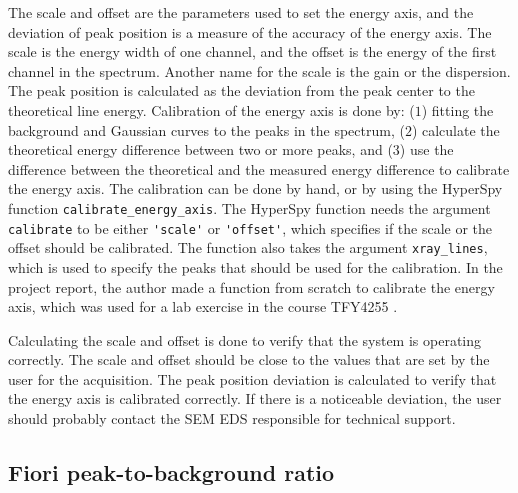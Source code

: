 The scale and offset are the parameters used to set the energy axis, and the deviation of peak position is a measure of the accuracy of the energy axis.
The scale is the energy width of one channel, and the offset is the energy of the first channel in the spectrum.
Another name for the scale is the gain or the dispersion.
The peak position is calculated as the deviation from the peak center to the theoretical line energy.
Calibration of the energy axis is done by: ($1$) fitting the background and Gaussian curves to the peaks in the spectrum, ($2$) calculate the theoretical energy difference between two or more peaks, and ($3$) use the difference between the theoretical and the measured energy difference to calibrate the energy axis.
The calibration can be done by hand, or by using the HyperSpy function \verb|calibrate_energy_axis|.
The HyperSpy function needs the argument \verb|calibrate| to be either \verb|'scale'| or \verb|'offset'|, which specifies if the scale or the offset should be calibrated.
The function also takes the argument \verb|xray_lines|, which is used to specify the peaks that should be used for the calibration.
In the project report, the author made a function from scratch to calibrate the energy axis, which was used for a lab exercise in the course TFY4255 \cite{project_report}.


Calculating the scale and offset is done to verify that the system is operating correctly.
The scale and offset should be close to the values that are set by the user for the acquisition.
The peak position deviation is calculated to verify that the energy axis is calibrated correctly.
If there is a noticeable deviation, the user should probably contact the SEM EDS responsible for technical support.




\subsection{Fiori peak-to-background ratio}
\label{theory:eds_performance:fiori}



